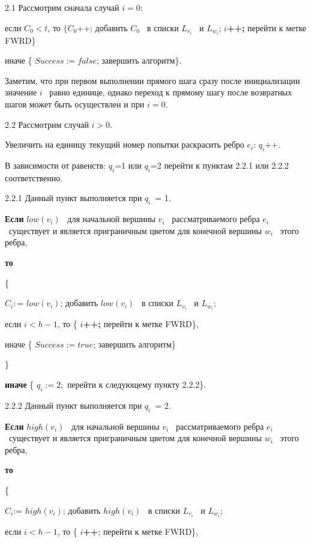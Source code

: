 2.1 Рассмотрим сначала случай  $i=0$:

если  $C_0<t$, то  $\{C_0$++; добавить  $C_0$ \ в списки  $L_{v_i}$ \ и  $L_{w_i}$;  $i$\textbf{++;} перейти к метке
\foreignlanguage{english}{FWRD}\}

иначе \{ $\mathit{Success}:=\mathit{false}$; завершить алгоритм\}.

Заметим, что при первом выполнении прямого шага сразу после инициализации значение  $i$ \ равно единице, однако переход
к прямому шагу после возвратных шагов может быть осуществлен и при  $i=0$.

2.2 Рассмотрим случай  $i>0$.

Увеличить на единицу текущий номер попытки раскрасить ребро  $e_i$:  $q_i$++.

В зависимости от равенств:  $q_i$=1 или  $q_i$=2 перейти к пунктам 2.2.1 или 2.2.2 соответственно.

2.2.1 Данный пункт выполняется при  $q_i$\ = 1.

\textbf{Если}  $\mathit{low}\left(v_i\right)$ \ для начальной вершины  $v_i$ \ рассматриваемого ребра  $e_i$
\ существует и является приграничным цветом для конечной вершины  $w_i$ \ этого ребра,

\textbf{то}

\{

$C_i:$= $\mathit{low}\left(v_i\right)$; добавить  $\mathit{low}\left(v_i\right)$ \ в списки  $L_{v_i}$ \ и  $L_{w_i}$;

если  $i<h-1$, то \{ $i$\textbf{++;} перейти к метке \foreignlanguage{english}{FWRD}\},

иначе \{ $\mathit{Success}:=\mathit{true}$; завершить алгоритм\}

\}

\textbf{иначе} \{ $q_i:=2;$ перейти к следующему пункту 2.2.2\}.

2.2.2 Данный пункт выполняется при  $q_i$\ = 2.

\textbf{Если}  $\mathit{high}\left(v_i\right)$ \ для начальной вершины  $v_i$ \ рассматриваемого ребра  $e_i$
\ существует и является приграничным цветом для конечной вершины  $w_i$ \ этого ребра,

\textbf{то}

\{

$C_i$:= $\mathit{high}\left(v_i\right)$; добавить  $\mathit{high}\left(v_i\right)$ \ в списки  $L_{v_i}$ \ и
$L_{w_i}$;

если  $i<h-1$, то \{ $i$\textbf{++}; перейти к метке \foreignlanguage{english}{FWRD}\},

